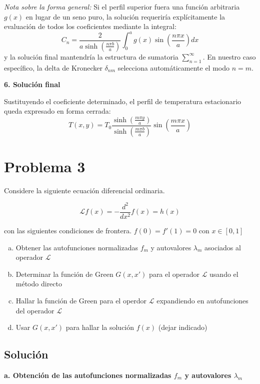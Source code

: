 \documentclass[a4paper]{article}
\begin{document}
\textit{Nota sobre la forma general:} Si el perfil superior fuera una función arbitraria $g(x)$ en lugar de un seno puro, la solución requeriría explícitamente la evaluación de todos los coeficientes mediante la integral:
$$ C_n = \frac{2}{a \sinh\left(\frac{n\pi b}{a}\right)} \int_0^a g(x) \sin\left(\frac{n\pi x}{a}\right) dx $$
y la solución final mantendría la estructura de sumatoria $\sum_{n=1}^\infty$. En nuestro caso específico, la delta de Kronecker $\delta_{nm}$ selecciona automáticamente el modo $n=m$.

\textbf{6. Solución final}

Sustituyendo el coeficiente determinado, el perfil de temperatura estacionario queda expresado en forma cerrada:
$$ T(x, y) = T_0 \frac{\sinh\left(\frac{m\pi y}{a}\right)}{\sinh\left(\frac{m\pi b}{a}\right)} \sin\left(\frac{m\pi x}{a}\right) $$


\section{Problema 3}

Considere la siguiente ecuación diferencial ordinaria. 

$$\mathscr{L}f(x) = -\frac{d^2}{dx^2}f(x) = h(x)$$

con las siguientes condiciones de frontera. $f(0)=f'(1)=0$ con $x\in[0,1]$

\begin{enumerate}[a.]
	\item Obtener las autofunciones normalizadas $f_m$ y autovalores $\lambda_m$ asociados al operador $\mathscr{L}$
	\item Determinar la función de Green $G(x, x')$ para el operador $\mathscr{L}$ usando el método directo
	\item Hallar la función de Green para el operdor $\mathscr{L}$ expandiendo en autofunciones del operador $\mathscr{L}$
	\item Usar $G(x, x')$ para hallar la solución $f(x)$ (dejar indicado)
\end{enumerate}


\subsection{Solución}


\textbf{a. Obtención de las autofunciones normalizadas $f_m$ y autovalores $\lambda_m$}
\end{document}
